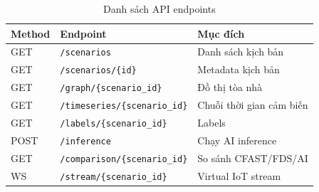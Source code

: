 \begin{appendices}
\begin{table}[H]
\centering
\caption{Danh sách API endpoints}
\label{tab:api_detail}
\begin{tabularx}{\textwidth}{l l X}
\toprule
\textbf{Method} & \textbf{Endpoint} & \textbf{Mục đích} \\
\midrule
GET  & \texttt{/scenarios}                & Danh sách kịch bản \\
GET  & \texttt{/scenarios/\{id\}}         & Metadata kịch bản \\
GET  & \texttt{/graph/\{scenario\_id\}}   & Đồ thị tòa nhà \\
GET  & \texttt{/timeseries/\{scenario\_id\}} & Chuỗi thời gian cảm biến \\
GET  & \texttt{/labels/\{scenario\_id\}}  & Labels \\
POST & \texttt{/inference}                & Chạy AI inference \\
GET  & \texttt{/comparison/\{scenario\_id\}} & So sánh CFAST/FDS/AI \\
WS   & \texttt{/stream/\{scenario\_id\}}  & Virtual IoT stream \\
\bottomrule
\end{tabularx}
\end{table}

\end{appendices}

